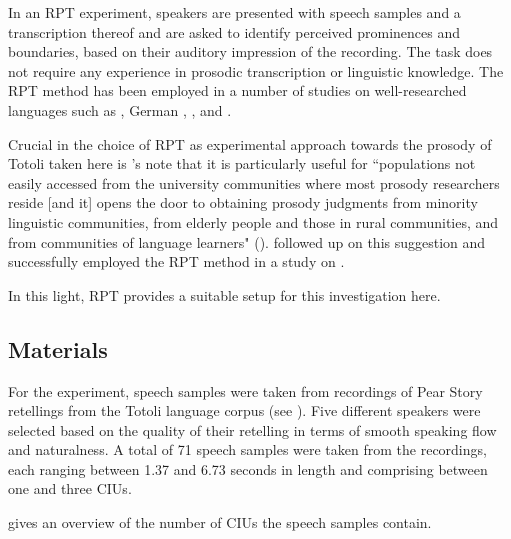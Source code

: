In an RPT experiment, speakers are presented with speech samples and a transcription thereof and are asked to identify perceived prominences and boundaries, based on their auditory impression of the recording.  The task does not require any experience in prosodic transcription or linguistic knowledge. The RPT method has been employed in a number of studies on well-researched languages such as  \citep{mo2008naive,cole2010signal}, German \citep{riesberg2020},  \citep{Ots_2019}, and  \citep{you2012determining}. 



Crucial in the choice of RPT as experimental approach towards the prosody of Totoli taken here is \citeauthor{Cole2016}'s  note that it is particularly useful for ``populations not easily accessed from the university communities where most prosody researchers reside [and it] opens the door to obtaining prosody judgments from minority linguistic communities, from elderly people and those in rural communities, and from communities of language learners" (\citeyear[12]{Cole2016}).  \citet{riesberg2018perception, riesberg2020} followed up on this suggestion and successfully employed the RPT method in a study on .


In this light, RPT provides a suitable setup for this investigation here. 









\subsection{Materials}
\label{Materials}

For the experiment, speech samples were taken from recordings of Pear Story  \citep{chafe1980pear} retellings from the Totoli language corpus (see  ). Five different speakers were selected based on the quality of their retelling in terms of smooth speaking flow and naturalness. A total of 71 speech samples were taken from the recordings, each ranging between 1.37 and 6.73 seconds in length and comprising between one and three CIUs.

 gives an overview of the number of CIUs the speech samples contain. 


